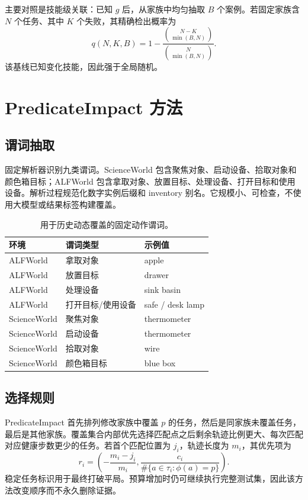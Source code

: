 \documentclass[10pt]{article}
\begin{document}
主要对照是技能级关联：已知 $g$ 后，从家族中均匀抽取 $B$ 个案例。若固定家族含 $N$ 个任务、其中 $K$ 个失败，其精确检出概率为
\begin{equation}
q(N,K,B)=1-\frac{\binom{N-K}{\min(B,N)}}{\binom{N}{\min(B,N)}}.
\end{equation}
该基线已知变化技能，因此强于全局随机。

\section{PredicateImpact 方法}
\subsection{谓词抽取}
固定解析器识别九类谓词。ScienceWorld 包含聚焦对象、启动设备、拾取对象和颜色箱目标；ALFWorld 包含拿取对象、放置目标、处理设备、打开目标和使用设备。解析过程规范化数字实例后缀和 inventory 别名。它规模小、可检查，不使用大模型或结果标签构建覆盖。

\begin{table}[t]
\centering
\caption{用于历史动态覆盖的固定动作谓词。}
\label{tab:predicateszh}
\begin{tabular}{lll}
\toprule
环境 & 谓词类型 & 示例值 \\
\midrule
ALFWorld & 拿取对象 & apple \\
ALFWorld & 放置目标 & drawer \\
ALFWorld & 处理设备 & sink basin \\
ALFWorld & 打开目标/使用设备 & safe / desk lamp \\
ScienceWorld & 聚焦对象 & thermometer \\
ScienceWorld & 启动设备 & thermometer \\
ScienceWorld & 拾取对象 & wire \\
ScienceWorld & 颜色箱目标 & blue box \\
\bottomrule
\end{tabular}
\end{table}

\subsection{选择规则}
PredicateImpact 首先排列修改家族中覆盖 $p$ 的任务，然后是同家族未覆盖任务，最后是其他家族。覆盖集合内部优先选择匹配点之后剩余轨迹比例更大、每次匹配对应健康步数更少的任务。若首个匹配位置为 $j_i$，轨迹长度为 $m_i$，其优先项为
\begin{equation}
r_i=\left(-\frac{m_i-j_i}{m_i},\frac{c_i}{\#\{a\in\tau_i:\phi(a)=p\}}\right).
\end{equation}
稳定任务标识用于最终打破平局。预算增加时仍可继续执行完整测试集，因此该方法改变顺序而不永久删除证据。
\end{document}
